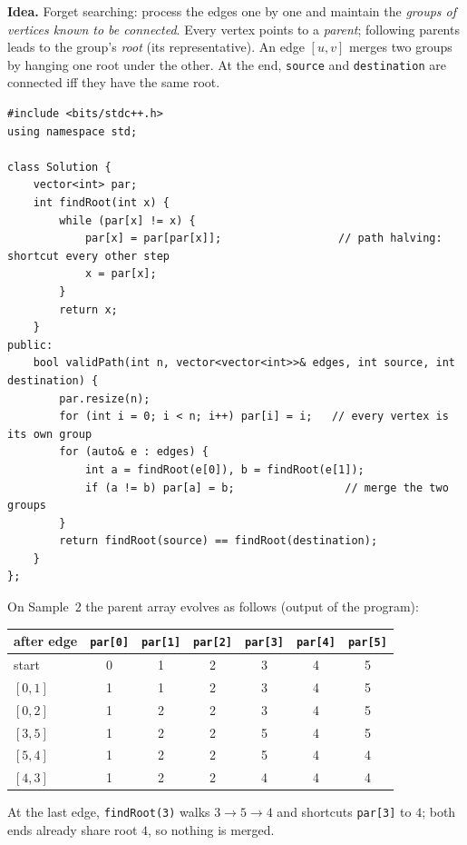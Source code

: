 \begin{alternativebox}
\textbf{Idea.} Forget searching: process the edges one by one and maintain the \emph{groups of vertices known to be connected}. Every vertex points to a \emph{parent}; following parents leads to the group's \emph{root} (its representative). An edge $[u,v]$ merges two groups by hanging one root under the other. At the end, \texttt{source} and \texttt{destination} are connected iff they have the same root.

\begin{lstlisting}[style=cpp]
#include <bits/stdc++.h>
using namespace std;

class Solution {
    vector<int> par;
    int findRoot(int x) {
        while (par[x] != x) {
            par[x] = par[par[x]];                  // path halving: shortcut every other step
            x = par[x];
        }
        return x;
    }
public:
    bool validPath(int n, vector<vector<int>>& edges, int source, int destination) {
        par.resize(n);
        for (int i = 0; i < n; i++) par[i] = i;   // every vertex is its own group
        for (auto& e : edges) {
            int a = findRoot(e[0]), b = findRoot(e[1]);
            if (a != b) par[a] = b;                 // merge the two groups
        }
        return findRoot(source) == findRoot(destination);
    }
};
\end{lstlisting}

On Sample~2 the parent array evolves as follows (output of the program):
\begin{center}\small
\begin{tabular}{@{}lcccccc@{}}
\toprule
\textbf{after edge} & \texttt{par[0]} & \texttt{par[1]} & \texttt{par[2]} & \texttt{par[3]} & \texttt{par[4]} & \texttt{par[5]} \\
\midrule
start     & 0 & 1 & 2 & 3 & 4 & 5 \\
$[0,1]$   & 1 & 1 & 2 & 3 & 4 & 5 \\
$[0,2]$   & 1 & 2 & 2 & 3 & 4 & 5 \\
$[3,5]$   & 1 & 2 & 2 & 5 & 4 & 5 \\
$[5,4]$   & 1 & 2 & 2 & 5 & 4 & 4 \\
$[4,3]$   & 1 & 2 & 2 & 4 & 4 & 4 \\
\bottomrule
\end{tabular}
\end{center}
At the last edge, \texttt{findRoot(3)} walks $3 \to 5 \to 4$ and shortcuts \texttt{par[3]} to $4$; both ends already share root $4$, so nothing is merged.


\end{alternativebox}
